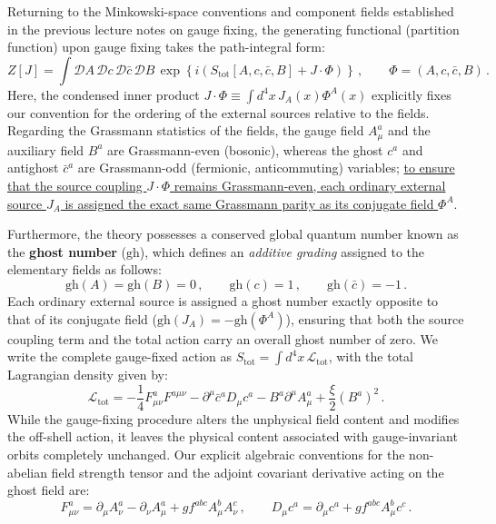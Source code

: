 Returning to the Minkowski-space conventions and component fields established in the previous lecture notes on gauge fixing, the generating functional (partition function) upon gauge fixing takes the path-integral form:
\begin{equation} \label{eq:ym_partition_function}
    Z[J] = \int \mathcal{D}A \, \mathcal{D}c \, \mathcal{D}\bar{c} \, \mathcal{D}B \, \exp\left\{ i \left( S_{\text{tot}}[A, c, \bar{c}, B] + J \cdot \Phi \right) \right\} \, , \qquad \Phi = (A, c, \bar{c}, B) \, .
\end{equation}
Here, the condensed inner product \(J \cdot \Phi \equiv \int d^4x \, J_A(x) \Phi^A(x)\) explicitly fixes our convention for the ordering of the external sources relative to the fields. Regarding the Grassmann statistics of the fields, the gauge field \(A_\mu^a\) and the auxiliary field \(B^a\) are Grassmann-even (bosonic), whereas the ghost \(c^a\) and antighost \(\bar{c}^a\) are Grassmann-odd (fermionic, anticommuting) variables; \uline{to ensure that the source coupling \(J \cdot \Phi\) remains Grassmann-even, each ordinary external source \(J_A\) is assigned the exact same Grassmann parity as its conjugate field \(\Phi^A\)}.

Furthermore, the theory possesses a conserved global quantum number known as the \textbf{ghost number} (\(\text{gh}\)), which defines an \textit{additive grading} assigned to the elementary fields as follows:
\[
    \text{gh}(A) = \text{gh}(B) = 0 \, , \qquad \text{gh}(c) = 1 \, , \qquad \text{gh}(\bar{c}) = -1 \, .
\]
Each ordinary external source is assigned a ghost number exactly opposite to that of its conjugate field (\(\text{gh}(J_A) = -\text{gh}(\Phi^A)\)), ensuring that both the source coupling term and the total action carry an overall ghost number of zero. We write the complete gauge-fixed action as \(S_{\text{tot}} = \int d^4x \, \mathcal{L}_{\text{tot}}\), with the total Lagrangian density given by:
\begin{equation} \label{eq:ym_total_lagrangian}
    \mathcal{L}_{\text{tot}} = -\frac{1}{4} F_{\mu\nu}^a F^{a\mu\nu} - \partial^\mu \bar{c}^a D_\mu c^a - B^a \partial^\mu A_\mu^a + \frac{\xi}{2} (B^a)^2 \, .
\end{equation}
While the gauge-fixing procedure alters the unphysical field content and modifies the off-shell action, it leaves the physical content associated with gauge-invariant orbits completely unchanged. Our explicit algebraic conventions for the non-abelian field strength tensor and the adjoint covariant derivative acting on the ghost field are:
\begin{equation} \label{eq:ym_conventions}
    F_{\mu\nu}^a = \partial_\mu A_\nu^a - \partial_\nu A_\mu^a + g f^{abc} A_\mu^b A_\nu^c \, , \qquad D_\mu c^a = \partial_\mu c^a + g f^{abc} A_\mu^b c^c \, .
\end{equation}

